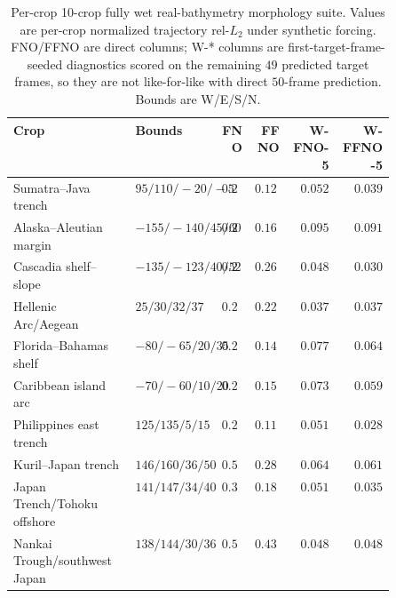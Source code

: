 \begin{table}[H]
\centering
\caption{Per-crop 10-crop fully wet real-bathymetry morphology suite. Values are per-crop normalized trajectory rel-$L_2$ under synthetic forcing. FNO/FFNO are direct columns; W-* columns are first-target-frame-seeded diagnostics scored on the remaining $49$ predicted target frames, so they are not like-for-like with direct $50$-frame prediction. Bounds are W/E/S/N.}
\label{tab:app-real-bath-crops}
\scriptsize
\setlength{\tabcolsep}{2pt}
\begin{tabular}{@{}p{0.32\linewidth}p{0.18\linewidth}rrrr@{}}
    \toprule
    Crop & Bounds & FNO & FFNO & W-FNO-5 & W-FFNO-5 \\
    \midrule
    Sumatra--Java trench & $95/110/{-}20/{-}5$ & $0.211$ & $0.120$ & $0.052$ & $0.039$ \\
    Alaska--Aleutian margin & ${-}155/{-}140/45/60$ & $0.286$ & $0.161$ & $0.095$ & $0.091$ \\
    Cascadia shelf--slope & ${-}135/{-}123/40/52$ & $0.235$ & $0.267$ & $0.048$ & $0.030$ \\
    Hellenic Arc/Aegean & $25/30/32/37$ & $0.285$ & $0.227$ & $0.037$ & $0.037$ \\
    Florida--Bahamas shelf & ${-}80/{-}65/20/35$ & $0.252$ & $0.142$ & $0.077$ & $0.064$ \\
    Caribbean island arc & ${-}70/{-}60/10/20$ & $0.202$ & $0.156$ & $0.073$ & $0.059$ \\
    Philippines east trench & $125/135/5/15$ & $0.219$ & $0.110$ & $0.051$ & $0.028$ \\
    Kuril--Japan trench & $146/160/36/50$ & $0.510$ & $0.288$ & $0.064$ & $0.061$ \\
    Japan Trench/Tohoku offshore & $141/147/34/40$ & $0.397$ & $0.186$ & $0.051$ & $0.035$ \\
    Nankai Trough/southwest Japan & $138/144/30/36$ & $0.530$ & $0.439$ & $0.048$ & $0.048$ \\
    \bottomrule
\end{tabular}
\end{table}

